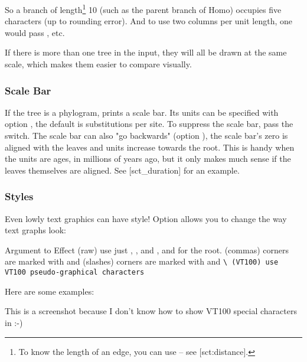 
\noindent{} So a branch of length\footnote{To know the length of an edge, you
can use \distance{}  -- see \in{}[sct:distance].  } 10 (such as
the parent branch of Homo) occupies five characters (up to rounding error). And
to use two columns per unit length, one would pass , etc.

If there is more than one tree in the input, they will all be drawn at the same scale, which makes them easier to compare visually.

\subsubsection{Scale Bar}

If the tree is a phylogram, \display{} prints a scale bar. Its units can be
specified with option , the default is substitutions per site. To
suppress the scale bar, pass the  switch. The scale bar can also "go
backwards" (option ), \ie{} the scale bar's zero is aligned with the
leaves and units increase towards the root. This is handy when the units are
ages, \eg{} in millions of years ago, but it only makes much sense if the leaves
themselves are aligned. See \in{}[sct_duration] for an example.

\subsubsection{Styles}

Even lowly text graphics can have style! Option  allows you to
change the way text graphs look:

\startalignment[center]
\starttabulate[|c|l|]
\NC Argument to  \NC Effect \NC\NR
\HL 
\NC {} \NC (raw) use just \type{|}, \type{-}, and \type{+}, and \type{=} for the root. \NC\NR
\NC {} \NC (commas) corners are marked with  and \type{,} \NC\NR
\NC {} \NC (slashes) corners are marked with \type{/} and \tt{\textbackslash} \NC\NR
\NC {} \NC (VT100) use VT100 pseudo-graphical characters \NC\NR
\stoptabulate
\stopalignment

\noindent{}Here are some examples:

 {}
 {}
{\tfx
\setupTABLE[c][each][width=\opteColWidth]
\bTABLE
	\bTR
		\bTD
		\eTD
		\bTD 
		\eTD
	\eTR
	\bTR
		\bTD
		\eTD
		\bTD 
			This is a screenshot because I don't know how to show VT100 special characters in \ConTeXt{} :-)
		\eTD
	\eTR
\eTABLE
}

